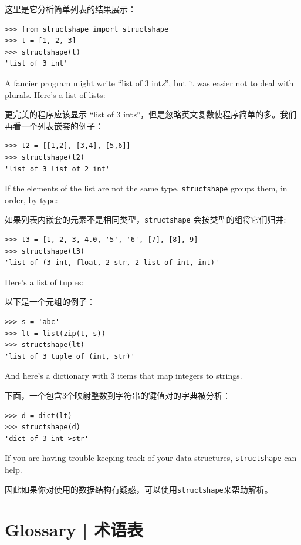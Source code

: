 这里是它分析简单列表的结果展示：

\begin{lstlisting}
>>> from structshape import structshape
>>> t = [1, 2, 3]
>>> structshape(t)
'list of 3 int'
\end{lstlisting}
%
A fancier program might write ``list of 3 int{\em s}'', but it
was easier not to deal with plurals.  Here's a list of lists:

更完美的程序应该显示 ``list of 3 int{\em s}''，但是忽略英文复数使程序简单的多。我们再看一个列表嵌套的例子：

\begin{lstlisting}
>>> t2 = [[1,2], [3,4], [5,6]]
>>> structshape(t2)
'list of 3 list of 2 int'
\end{lstlisting}
%
If the elements of the list are not the same type,
{\tt structshape} groups them, in order, by type:

如果列表内嵌套的元素不是相同类型，\lstinline{structshape} 会按类型的组将它们归并:

\begin{lstlisting}
>>> t3 = [1, 2, 3, 4.0, '5', '6', [7], [8], 9]
>>> structshape(t3)
'list of (3 int, float, 2 str, 2 list of int, int)'
\end{lstlisting}
%
Here's a list of tuples:

以下是一个元组的例子：

\begin{lstlisting}
>>> s = 'abc'
>>> lt = list(zip(t, s))
>>> structshape(lt)
'list of 3 tuple of (int, str)'
\end{lstlisting}
%
And here's a dictionary with 3 items that map integers to strings.

下面，一个包含3个映射整数到字符串的键值对的字典被分析：

\begin{lstlisting}
>>> d = dict(lt)
>>> structshape(d)
'dict of 3 int->str'
\end{lstlisting}
%
If you are having trouble keeping track of your data structures,
{\tt structshape} can help.

因此如果你对使用的数据结构有疑惑，可以使用\lstinline{structshape}来帮助解析。

\section{Glossary  |  术语表}

